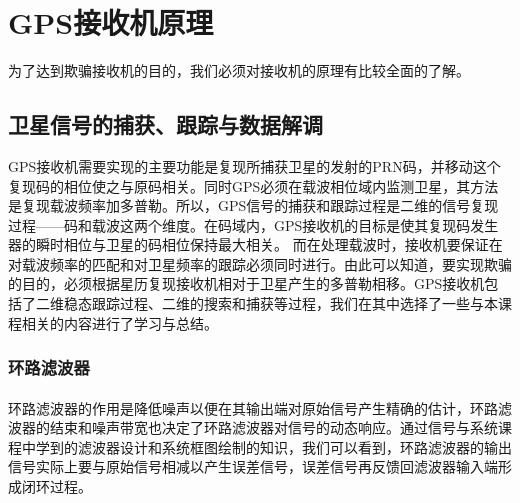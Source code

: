 \documentclass[UTF8,titlepage]{ctexart}
\begin{document}
\section*{GPS接收机原理}为了达到欺骗接收机的目的，我们必须对接收机的原理有比较全面的了解。
\subsection*{卫星信号的捕获、跟踪与数据解调}
GPS接收机需要实现的主要功能是复现所捕获卫星的发射的PRN码，并移动这个复现码的相位使之与原码相关。同时GPS必须在载波相位域内监测卫星，其方法是复现载波频率加多普勒。所以，GPS信号的捕获和跟踪过程是二维的信号复现过程——码和载波这两个维度。在码域内，GPS接收机的目标是使其复现码发生器的瞬时相位与卫星的码相位保持最大相关。 而在处理载波时，接收机要保证在对载波频率的匹配和对卫星频率的跟踪必须同时进行。由此可以知道，要实现欺骗的目的，必须根据星历复现接收机相对于卫星产生的多普勒相移。GPS接收机包括了二维稳态跟踪过程、二维的搜索和捕获等过程，我们在其中选择了一些与本课程相关的内容进行了学习与总结。
\subsubsection*{环路滤波器}
\paragraph*{}环路滤波器的作用是降低噪声以便在其输出端对原始信号产生精确的估计，环路滤波器的结束和噪声带宽也决定了环路滤波器对信号的动态响应。通过信号与系统课程中学到的滤波器设计和系统框图绘制的知识，我们可以看到，环路滤波器的输出信号实际上要与原始信号相减以产生误差信号，误差信号再反馈回滤波器输入端形成闭环过程。
\end{document}
